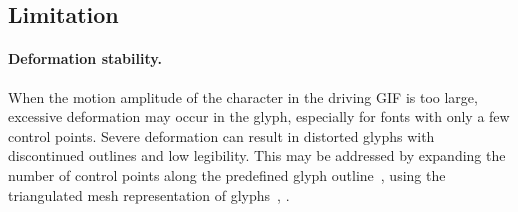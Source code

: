 \subsection{Limitation}



\paragraph{Deformation stability.} 
When the motion amplitude of the character in the driving GIF is too large, excessive deformation may occur in the glyph, especially for fonts with only a few control points.
Severe deformation can result in distorted glyphs with discontinued outlines and low legibility.
This may be addressed by expanding the number of control points along the predefined glyph outline~\cite{iluz2023word}, using the triangulated mesh representation of glyphs~\cite{desbrun1999implicit}, .


